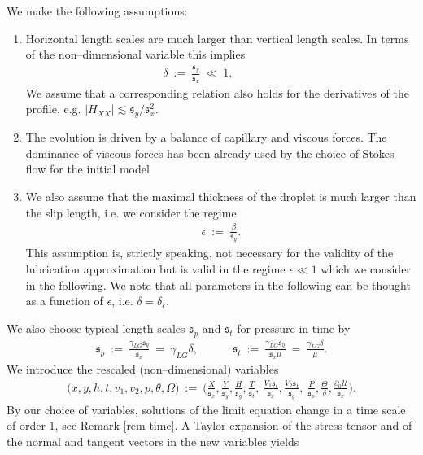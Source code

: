 \documentclass[pagesize,pdftex]{amsart}
\newcommand{\p}{\partial}
\renewcommand{\d}{\delta}
\newcommand{\UU}{{\mathcal U}}
\newcommand{\bet}{\beta}
\newcommand{\gam}{\gamma}
\newcommand{\eps}{\epsilon}
\newcommand{\ang}{\theta}
\newcommand{\Ome}{\Omega}
\newcommand{\LAM}{{\mathfrak s}}
\begin{document}
\medskip

We make the following assumptions:
\begin{enumerate}
\item Horizontal length scales are much larger than vertical length scales. In
  terms of the non--dimensional variable this implies
  \begin{align}
  \delta \ := \ %
  \frac {\LAM_y}{\LAM_x} \ \ll  \ 1, \qquad\qquad %
  \end{align}
  We assume that a corresponding relation also holds for the derivatives of the
  profile, e.g. $|H_{XX}| \lesssim \LAM_y/\LAM_x^2$.
\item The evolution is driven by a balance of capillary and viscous forces. The
  dominance of viscous forces has been already used by the choice of Stokes flow
  for the initial model
\item We also assume that the maximal thickness of the droplet is much larger
  than the slip length, i.e. we consider the regime
  \begin{align}
  \eps \ := \ \frac{\bet}{\LAM_y}.
  \end{align}
  This assumption is, strictly speaking, not necessary for the validity of the
  lubrication approximation but is valid in the regime $\eps \ll 1$ which we
  consider in the following. We note that all parameters in the following can be
  thought as a function of $\eps$, i.e. $\d = \d_\eps$.
\end{enumerate}
We also choose  typical length scales $\LAM_p$ and $\LAM_t$ for pressure in time by
\begin{align} \label{res-2} %
  \LAM_p \ %
  := \ \frac{\gam_{LG} \LAM_y}{\LAM_x} \ %
  = \ \gam_{LG} \delta, \quad\qquad  %
  \LAM_t \ %
  := \ \frac{\gam_{LG} \LAM_y}{\LAM_x \mu}  \ %
  = \ \frac{\gam_{LG} \delta}{\mu}.
\end{align}
We introduce the rescaled (non--dimensional) variables
\begin{align} \label{res-var} %
  \big( x, y, h, t, v_1, v_2, p, \ang, \Ome \big) \  %
  := \ \Big( \frac{X}{\LAM_x}, \frac{Y}{\LAM_y}, \frac{H}{\LAM_y}, \frac{T}{\LAM_t}, \ %
   \frac{V_1 \LAM_t}{\LAM_x}, \frac{V_2 \LAM_t}{\LAM_y}, \ \frac{P}{\LAM_p}, \frac{\Theta }{\delta }, \frac{\p_0 \UU}{\LAM_x} \Big). %
\end{align}
By our choice of variables, solutions of the limit equation change in a time
scale of order $1$, see Remark \ref{rem-time}. A Taylor expansion of the stress
tensor and of the normal and tangent vectors in the new variables yields
\end{document}
